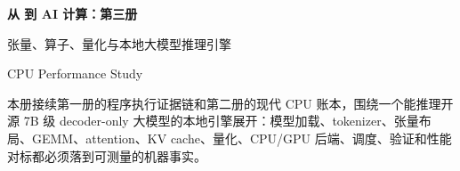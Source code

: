\begin{titlepage}
\thispagestyle{empty}
\vspace*{2.2cm}
{\Huge\bfseries\color{BookNavy} 从 \cpp 到 AI 计算：第三册\par}
\vspace{0.68cm}
{\Large\color{BookAccent} 张量、算子、量化与本地大模型推理引擎\par}
\vspace{1.25cm}
{\large CPU Performance Study\par}
\vfill
{\small\color{BookMuted} 本册接续第一册的程序执行证据链和第二册的现代 CPU 账本，围绕一个能推理开源 7B 级 decoder-only 大模型的本地引擎展开：模型加载、tokenizer、张量布局、GEMM、attention、KV cache、量化、CPU/GPU 后端、调度、验证和性能对标都必须落到可测量的机器事实。\par}
\end{titlepage}
